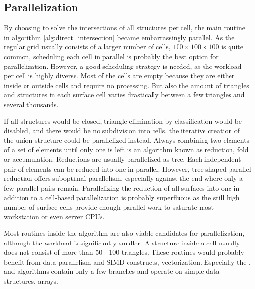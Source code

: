 \subsection{Parallelization}
\label{sec:parallelization}

By choosing to solve the intersections of all structures per cell, the main routine in algorithm \ref{alg:direct_intersection} became embarrassingly parallel.
As the regular grid usually consists of a larger number of cells, \eg $100 \times 100 \times 100$ is quite common, scheduling each cell in parallel is probably the best option for parallelization.
However, a good scheduling strategy is needed, as the workload per cell is highly diverse.
Most of the cells are empty because they are either inside or outside cells and require no processing.
But also the amount of triangles and structures in each surface cell varies drastically between a few triangles and several thousands.

If all structures would be closed, \ie triangle elimination by classification would be disabled, and there would be no subdivision into cells, the iterative creation of the union structure could be parallelized instead.
Always combining two elements of a set of elements until only one is left is an algorithm known as reduction, fold or accumulation.
Reductions are usually parallelized as tree.
Each independent pair of elements can be reduced into one in parallel.
However, tree-shaped parallel reduction offers suboptimal parallelism, especially against the end where only a few parallel pairs remain.
Parallelizing the reduction of all surfaces into one in addition to a cell-based parallelization is probably superfluous as the still high number of surface cells provide enough parallel work to saturate most workstation or even server CPUs.

Most routines inside the  algorithm are also viable candidates for parallelization, although the workload is significantly smaller.
A structure inside a cell usually does not consist of more than 50 - 100 triangles.
These routines would probably benefit from data parallelism and SIMD constructs, \ie vectorization.
Especially the ,  and  algorithms contain only a few branches and operate on simple data structures, \ie arrays.

